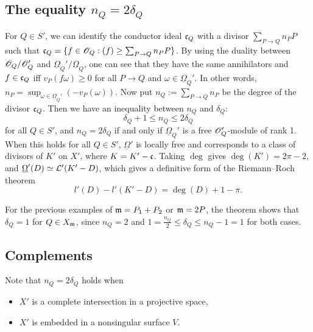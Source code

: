 \documentclass[letterpaper, 12pt]{article}
\begin{document}
\subsection{The equality $n_Q = 2 \delta_Q$}

For $Q \in S'$, we can identify the conductor ideal $\mathfrak{c}_Q$ with a divisor $\sum_{P \to Q} n_P P$ such that $\mathfrak{c}_Q = \{f \in \mathscr{O}_Q: (f) \ge \sum_{P \to Q} n_P P\}$.
By using the duality between $\mathscr{O}_Q / \mathscr{O}_Q'$ and $\underline{\Omega}_Q' / \underline{\Omega}_Q$, one can see that they have the same annihilators and $f \in \mathfrak{c}_Q$ iff $v_P(f \omega) \ge 0$ for all $P \to Q$ and $\omega \in \underline{\Omega}_Q'$.
In other words, $n_P = \sup_{\omega \in \underline{\Omega}_Q'} (- v_P(\omega))$.
Now put $n_Q := \sum_{P \to Q} n_P$ be the degree of the divisor $\mathfrak{c}_Q$.
Then we have an inequality between $n_Q$ and $\delta_Q$:
$$
\delta_Q + 1 \le n_Q \le 2 \delta_Q
$$
for all $Q \in S'$, and $n_Q = 2 \delta_Q$ if and only if $\underline{\Omega}_Q'$ is a free $\mathscr{O}_Q'$-module of rank 1.
When this holds for all $Q \in S'$, $\underline{\Omega}'$ is locally free and corresponds to a class of divisors of $K'$ on $X'$, where $K = K' - \mathfrak{c}$.
Taking $\deg$ gives $\deg(K') = 2\pi - 2$, and $\underline{\Omega}'(D) \simeq \mathcal{L}'(K' - D)$, which gives a definitive form of the Riemann--Roch theorem
$$
l'(D) - l'(K' - D) = \deg(D) + 1 - \pi.
$$

For the previous examples of $\mathfrak{m} = P_1 + P_2$ or $\mathfrak{m} = 2P$, the theorem shows that $\delta_Q = 1$ for $Q \in X_{\mathfrak{m}}$, since $n_Q = 2$ and $1 = \frac{n_Q}{2} \le \delta_Q \le n_Q - 1 = 1$ for both cases.

\subsection{Complements}

Note that $n_Q = 2 \delta_Q$ holds when
\begin{itemize}
    \item $X'$ is a complete intersection in a projective space,
    \item $X'$ is embedded in a nonsingular surface $V$.
\end{itemize}


\end{document}
